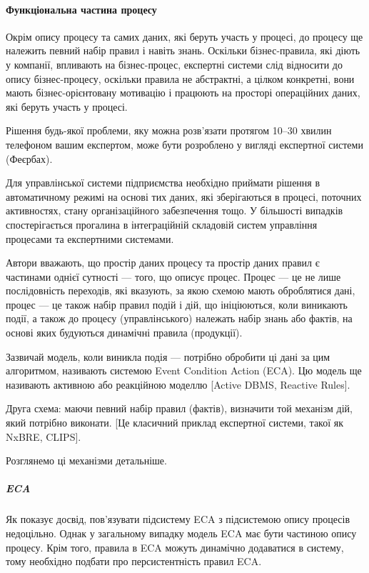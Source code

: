\documentclass{memoir}
\begin{document}
\paragraph{Функціональна частина процесу}

Окрім опису процесу та самих даних, які беруть участь у процесі, до процесу ще належить певний набір правил і навіть знань. Оскільки бізнес-правила, які діють у компанії, впливають на бізнес-процес, експертні системи слід відносити до опису бізнес-процесу, оскільки правила не абстрактні, а цілком конкретні, вони мають бізнес-орієнтовану мотивацію і працюють на просторі операційних даних, які беруть участь у процесі.

Рішення будь-якої проблеми, яку можна розв’язати протягом 10–30 хвилин телефоном вашим експертом, може бути розроблено у вигляді експертної системи (Феєрбах).

Для управлінської системи підприємства необхідно приймати рішення в автоматичному режимі на основі тих даних, які зберігаються в процесі, поточних активностях, стану організаційного забезпечення тощо. У більшості випадків спостерігається прогалина в інтеграційній складовій систем управління процесами та експертними системами.

Автори вважають, що простір даних процесу та простір даних правил є частинами однієї сутності — того, що описує процес. Процес — це не лише послідовність переходів, які вказують, за якою схемою мають оброблятися дані, процес — це також набір правил подій і дій, що ініціюються, коли виникають події, а також до процесу (управлінського) належать набір знань або фактів, на основі яких будуються динамічні правила (продукції).

Зазвичай модель, коли виникла подія — потрібно обробити ці дані за цим алгоритмом, називають системою Event Condition Action (ECA). Цю модель ще називають активною або реакційною моделлю [Active DBMS, Reactive Rules].

Друга схема: маючи певний набір правил (фактів), визначити той механізм дій, який потрібно виконати. [Це класичний приклад експертної системи, такої як NxBRE, CLIPS].

Розглянемо ці механізми детальніше.

\subparagraph{ECA}

Як показує досвід, пов’язувати підсистему ECA з підсистемою опису процесів недоцільно. Однак у загальному випадку модель ECA має бути частиною опису процесу. Крім того, правила в ECA можуть динамічно додаватися в систему, тому необхідно подбати про персистентність правил ECA.
\end{document}
